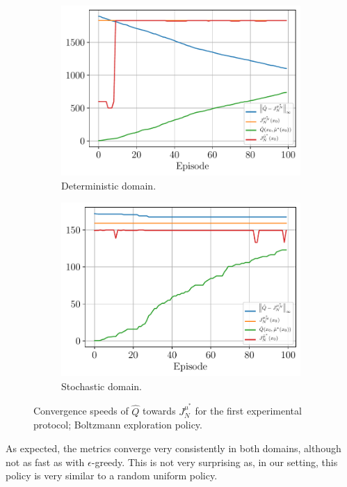 \documentclass[a4paper, 12pt]{article}
\begin{document}
    \begin{figure}[h]
        \begin{subfigure}[b]{0.47\textwidth}
            \centering
            \includegraphics[width=\textwidth]{resources/pdf/5.4_deterministic.pdf}
            \caption{Deterministic domain.}
        \end{subfigure}
        \hfill
        \begin{subfigure}[b]{0.47\textwidth}
            \centering
            \includegraphics[width=\textwidth]{resources/pdf/5.4_stochastic.pdf}
            \caption{Stochastic domain.}
        \end{subfigure}
        \caption{Convergence speeds of $\hat{Q}$ towards $J^{\mu^*}_N$ for the first experimental protocol; Boltzmann exploration policy.}
        \label{fig:ql.first.protocol.boltzmann}
    \end{figure}
    
    As expected, the metrics converge very consistently in both domains, although not as fast as with $\epsilon$-greedy. This is not very surprising as, in our setting, this policy is very similar to a random uniform policy.

    \newpage

    \printbibliography
\end{document}
